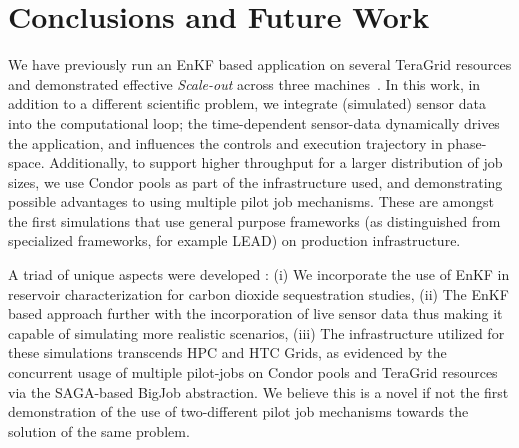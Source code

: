 \documentclass[10pt,conference,final]{IEEEtran}
\newcommand{\jhanote}[1]{ {\textcolor{red} { ***Jha: #1 }}}
\newcommand{\yyenote}[1]{ {\textcolor{blue} { ***yye00: #1 }}}
\newcommand{\jhanote}[1]{}
\newcommand{\yyenote}[1]{}
\begin{document}



\section*{Conclusions and Future Work}

We have previously run an EnKF based application on several TeraGrid resources and demonstrated effective {\it Scale-out} across three machines~\cite{gmac}. In this work, in addition to a different scientific problem, we integrate (simulated) sensor data into the computational loop; the time-dependent sensor-data dynamically drives the application, and influences the controls and execution trajectory in phase-space. Additionally, to support higher throughput for a larger distribution of 
job sizes, we use Condor pools as part of the infrastructure used, and 
demonstrating possible advantages to using multiple pilot job mechanisms. These are amongst the first simulations that use general purpose frameworks (as distinguished from specialized frameworks, for example LEAD) on production infrastructure.


A triad of unique aspects were developed : (i) We incorporate the use of EnKF in reservoir characterization for carbon dioxide sequestration studies, %
(ii) The EnKF based approach further with the incorporation of live sensor data thus making it capable of simulating more realistic scenarios, (iii) The infrastructure
utilized for these simulations transcends HPC and HTC Grids, as evidenced by the
concurrent usage of multiple pilot-jobs on Condor pools and TeraGrid resources via
the SAGA-based BigJob abstraction.
We believe this is a novel if not the first demonstration of the use of two-different pilot job mechanisms towards the solution of the same problem.


 

\end{document}
